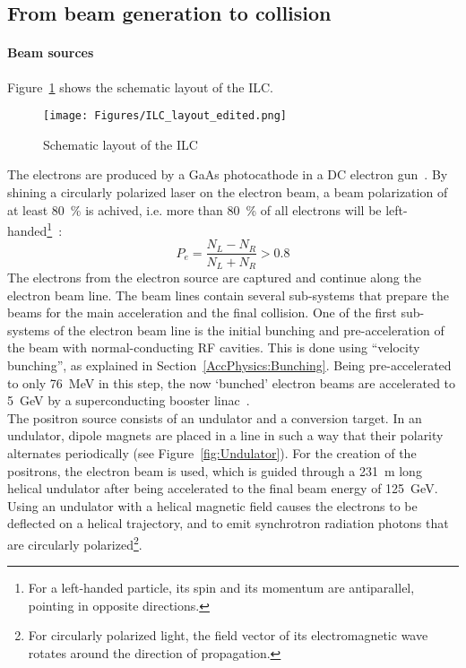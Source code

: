 \subsection{From beam generation to collision}
\label{ILC:layout:details}
\paragraph{Beam sources}
Figure~\ref{fig:ILC_Layout} shows the schematic layout of the ILC.
\begin{figure}
\centering
\texttt{[image: Figures/ILC\_layout\_edited.png]}
\caption[Schematic layout of the ILC]{Schematic layout of the ILC~\cite[based on p. 9]{TDR1}}
\label{fig:ILC_Layout}
\end{figure}
The electrons are produced by a GaAs photocathode in a DC electron gun~\cite[p. 13]{TDR32}.
By shining a circularly polarized laser on the electron beam, a beam polarization of at least \SI{80}{\percent} is achived, i.e. more than \SI{80}{\percent} of all electrons will be left-handed\footnote{For a left-handed particle, its spin and its momentum are antiparallel, pointing in opposite directions.}~\cite[p. 81]{TDR32}:
\begin{equation}
 P_e = \frac{N_L-N_R}{N_L+N_R} > 0.8
\end{equation}
The electrons from the electron source are captured and continue along the electron beam line.
The beam lines contain several sub-systems that prepare the beams for the main acceleration and the final collision.
One of the first sub-systems of the electron beam line is the initial bunching and pre-acceleration of the beam with normal-conducting RF cavities.
This is done using ``velocity bunching'', as explained in Section~\ref{AccPhysics:Bunching}.
Being pre-accelerated to only \SI{76}{\MeV} in this step, the now `bunched' electron beams are accelerated to \SI{5}{\GeV} by a  superconducting booster linac~\cite[p. 81f]{TDR32}.\\
The positron source consists of an undulator and a conversion target.
In an undulator, dipole magnets are placed in a line in such a way that their polarity alternates periodically (see Figure~\ref{fig:Undulator}).
For the creation of the positrons, the electron beam is used, which is guided through a \SI{231}{\meter} long helical undulator after being accelerated to the final beam energy of \SI{125}{\GeV}.
Using an undulator with a helical magnetic field causes the electrons to be deflected on a helical trajectory, and to emit synchrotron radiation photons that are circularly polarized\footnote{For circularly polarized light, the field vector of its electromagnetic wave rotates around the direction of propagation.}.
